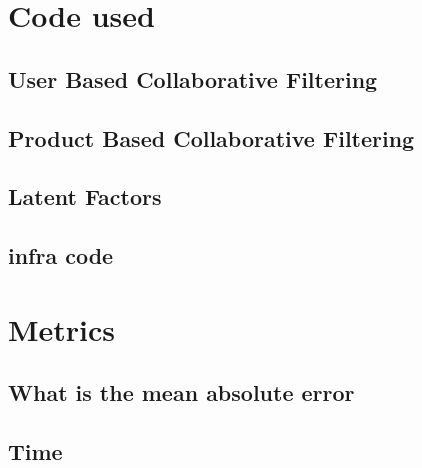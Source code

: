 \section{Code used}
\subsection{User Based Collaborative Filtering}
\subsection{Product Based Collaborative Filtering}
\subsection{Latent Factors}
\subsection{infra code}
\section{Metrics}
\subsection{What is the mean absolute error}
\subsection{Time}
\listoftables
\newpage
\listoffigures